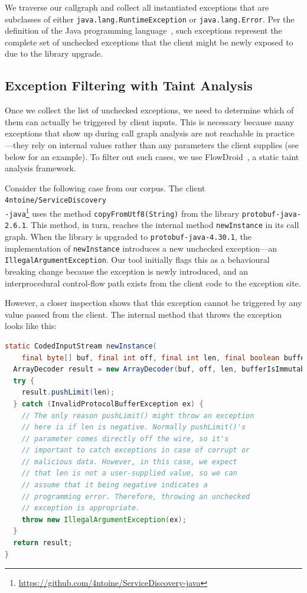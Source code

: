 We traverse our callgraph and collect all instantiated exceptions that are subclasses of either \texttt{java.lang.RuntimeException} or \texttt{java.lang.Error}. Per the definition of the Java programming language~\cite{Gosling2021java}, such exceptions represent the complete set of unchecked exceptions that the client might be newly exposed to due to the library upgrade.

\subsection{Exception Filtering with Taint Analysis}

Once we collect the list of unchecked exceptions, we need to determine which of them can actually be triggered by client inputs. This is necessary because many exceptions that show up during call graph analysis are not reachable in practice—they rely on internal values rather than any parameters the client supplies (see below for an example). To filter out such cases, we use FlowDroid~\cite{Arzt14:_flowdroid}, a static taint analysis framework.

Consider the following case from our corpus. The client \texttt{4ntoine/ServiceDiscovery\\-java}\footnote{\url{https://github.com/4ntoine/ServiceDiscovery-java}} uses the method \texttt{copyFromUtf8(String)} from the library \texttt{protobuf-java-2.6.1}. This method, in turn, reaches the internal method \texttt{newInstance} in its call graph. When the library is upgraded to \texttt{protobuf-java-4.30.1}, the implementation of \texttt{newInstance} introduces a new unchecked exception—an \texttt{IllegalArgumentException}. Our tool initially flags this as a behavioural breaking change because the exception is newly introduced, and an interprocedural control-flow path exists from the client code to the exception site.

However, a closer inspection shows that this exception cannot be triggered by any value passed from the client. The internal method that throws the exception looks like this:

\begin{lstlisting}[language=Java]
static CodedInputStream newInstance(
    final byte[] buf, final int off, final int len, final boolean bufferIsImmutable) {
  ArrayDecoder result = new ArrayDecoder(buf, off, len, bufferIsImmutable);
  try {
    result.pushLimit(len);
  } catch (InvalidProtocolBufferException ex) {
    // The only reason pushLimit() might throw an exception
    // here is if len is negative. Normally pushLimit()'s
    // parameter comes directly off the wire, so it's 
    // important to catch exceptions in case of corrupt or
    // malicious data. However, in this case, we expect 
    // that len is not a user-supplied value, so we can 
    // assume that it being negative indicates a 
    // programming error. Therefore, throwing an unchecked 
    // exception is appropriate.
    throw new IllegalArgumentException(ex);
  }
  return result;
}
\end{lstlisting}

